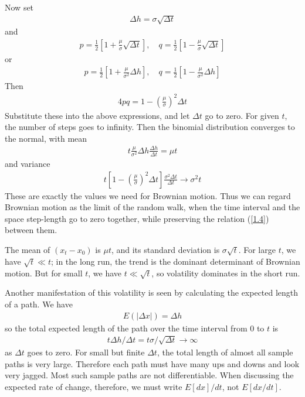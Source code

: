 \documentclass[12pt]{article}
\theoremstyle{definition}
\begin{document}
Now set
\begin{align}
\Delta h=\sigma \sqrt{\Delta t} \label{1.4}
\end{align}
and
\begin{align}
p=\frac{1}{2}\left[1+\frac{\mu}{\sigma} \sqrt{\Delta t}\right], \quad q=\frac{1}{2}\left[1-\frac{\mu}{\sigma} \sqrt{\Delta t}\right] \label{1.5}
\end{align}
or
\begin{align*}
p=\frac{1}{2}\left[1+\frac{\mu}{\sigma^{2}} \Delta h\right], \quad q=\frac{1}{2}\left[1-\frac{\mu}{\sigma^{2}} \Delta h\right]
\end{align*}
Then
\begin{align*}
4 p q=1-\left(\frac{\mu}{\sigma}\right)^{2} \Delta t
\end{align*}
Substitute these into the above expressions, and let $\Delta t$ go to zero. For given $t$, the number of steps goes to infinity. Then the binomial distribution converges to the normal, with mean
\begin{align*}
t \frac{\mu}{\sigma^{2}} \Delta h \frac{\Delta h}{\Delta t}=\mu t
\end{align*}
and variance
\begin{align*}
t\left[1-\left(\frac{\mu}{\sigma}\right)^{2} \Delta t\right] \frac{\sigma^{2} \Delta t}{\Delta t} \rightarrow \sigma^{2} t
\end{align*}
These are exactly the values we need for Brownian motion. Thus we can regard Brownian motion as the limit of the random walk, when the time interval and the space step-length go to zero together, while preserving the relation (\ref{1.4}) between them.

The mean of $\left(x_{t}-x_{0}\right)$ is $\mu t$, and its standard deviation is $\sigma \sqrt{t}$. For large $t$, we have $\sqrt{t} \ll t$; in the long run, the trend is the dominant determinant of Brownian motion. But for small $t$, we have $t \ll \sqrt{t}$, so volatility dominates in the short run.

Another manifestation of this volatility is seen by calculating the expected length of a path. We have
\begin{align*}
E(|\Delta x|)=\Delta h
\end{align*}
so the total expected length of the path over the time interval from 0 to $t$ is
\begin{align*}
t \Delta h / \Delta t=t \sigma / \sqrt{\Delta t} \rightarrow \infty
\end{align*}
as $\Delta t$ goes to zero. For small but finite $\Delta t$, the total length of almost all sample paths is very large. Therefore each path must have many ups and downs and look very jagged. Most such sample paths are not differentiable. When discussing the expected rate of change, therefore, we must write $E[d x] / d t$, not $E[d x / d t]$.
\end{document}
